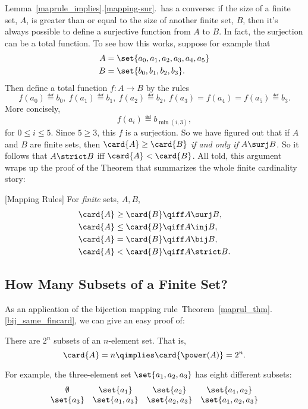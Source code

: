 Lemma~\ref{maprule_implies}.\ref{mapping-sur}.\ has a converse:
if the size of a finite set, $A$, is greater than or equal to the size of
another finite set, $B$, then it's always possible to define a
surjective function from $A$ to $B$.  In fact, the surjection can be a
total function.  To see how this works, suppose for example that
\begin{align*}
A & =\set{a_0,a_1,a_2,a_3,a_4,a_5}\\
B & =\set{b_0,b_1,b_2,b_3}.
\end{align*}
Then define a total function $f:A\to B$ by the rules
\[
f(a_0) \eqdef b_0,\  f(a_1) \eqdef b_1,\  f(a_2) \eqdef b_2,\  f(a_3)=
f(a_4)=f(a_5) \eqdef b_3.
\]
More concisely,
\[
f(a_i) \eqdef b_{\min(i,3)},
\]
for $0 \le i \le 5$.  Since $5 \geq 3$, this $f$ is a surjection.
\iffalse In fact, if $A$ and $B$ are finite sets of the same size,
then we could also define a bijection from $A$ to $B$ by this method.
\fi So we have figured out that if $A$ and $B$ are finite sets, then
$\card{A} \geq \card{B}$ \emph{if and only if} $A \surj B$.  So it
follows that $A \strict B$ iff $\card{A} < \card{B}$.  All told, this
argument wraps up the proof of the Theorem that summarizes the whole
finite cardinality story:
\begin{theorem}\label{maprul_thm}
[Mapping Rules] \mbox{}
For \emph{finite} sets, $A,B$,
\begin{align}
\card{A} \geq \card{B} & \qiff A \surj B,\\
\card{A} \leq \card{B} & \qiff A \inj B,\\
\card{A} = \card{B} & \qiff A \bij B,\label{bij_same_fincard}\\
\card{A} < \card{B} & \qiff A \strict B.
\end{align}
\end{theorem}

\subsection{How Many Subsets of a Finite Set?}
As an application of the bijection mapping
rule~Theorem~\ref{maprul_thm}.\eqref{bij_same_fincard}, we can give an
easy proof of:
\begin{theorem}\label{powset_fincard}
There are $2^n$ subsets of an $n$-element set.  That is,
\[
\card{A} = n \qimplies \card{\power(A)} = 2^n.
\]
\end{theorem}

For example, the three-element set $\set{a_1, a_2, a_3}$ has eight
different subsets:
%
\[
\begin{array}{cccc}
\emptyset & \set{a_1} & \set{a_2} & \set{a_1, a_2} \\
\set{a_3} & \set{a_1, a_3} & \set{a_2, a_3} & \set{a_1, a_2, a_3}
\end{array}
\]

